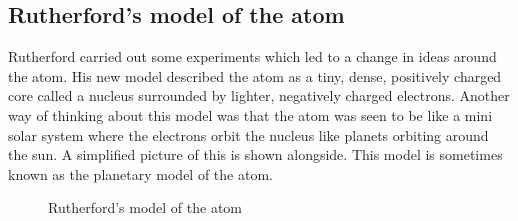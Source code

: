             \subsection*{Rutherford's model of the atom}
            \nopagebreak
\begin{minipage}{.5\textwidth}
            \label{m38756*id254751}Rutherford carried out some experiments which led to a change in ideas around the atom. His new model described the atom as a tiny, dense, positively charged core called a nucleus surrounded by lighter, negatively charged electrons. Another way of thinking about this model was that the atom was seen to be like a mini solar system where the electrons orbit the nucleus like planets orbiting around the sun. A simplified picture of this is shown alongside. This model is sometimes known as the planetary model of the atom.\\
\end{minipage}
\begin{minipage}{.5\textwidth}
	\begin{figure}[H] %
    \begin{center}
\caption{Rutherford's model of the atom}
\end{center}
\label{rutherfordmodel}
 \end{figure} 
\end{minipage}      \vspace{-.8cm}
      \label{m38756*uid6}
